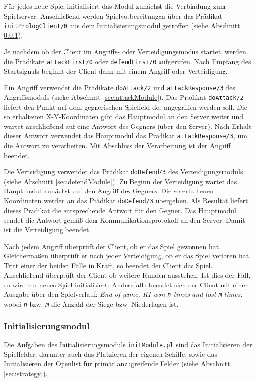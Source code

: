 	Für jedes neue Spiel initialisiert das Modul zunächst die Verbindung zum
	Spielserver. Anschließend werden Spielvorbereitungen über das Prädikat \texttt{initPrologClient/0} aus dem 
	Initialisierungsmodul getroffen (siehe Abschnitt \ref{sec:initModule}).
	
	Je nachdem ob der Client im Angriffs- oder Verteidigungsmodus startet, werden die Prädikate \texttt{attackFirst/0} oder
	\texttt{defendFirst/0} aufgerufen. Nach Empfang des Startsignals beginnt der Client dann mit einem Angriff oder Verteidigung.
	
	Ein Angriff verwendet die Prädikate \texttt{doAttack/2} und \texttt{attackResponse/3} des Angriffsmoduls (siehe Abschnitt
	\ref{sec:attackModule}).
	Das Prädikat \texttt{doAttack/2} liefert den Punkt auf dem gegnerischen Spielfeld der angegriffen werden soll.
	Die so erhaltenen X-Y-Koordinaten gibt das Hauptmodul an den Server weiter und wartet anschließend auf eine Antwort des 
	Gegners (über den Server). 
	Nach Erhalt dieser Antwort verwendet das Hauptmodul das Prädikat \texttt{attackResponse/3}, um die Antwort zu verarbeiten.
	Mit Abschluss der Verarbeitung ist der Angriff beendet.
	
	Die Verteidigung verwendet das Prädikat \texttt{doDefend/3} des Verteidigungsmoduls (siehe Abschnitt \ref{sec:defendModule}).
	Zu Beginn der Verteidigung wartet das Hauptmodul zunächst auf den Angriff des Gegners. Die so erhaltenen Koordinaten
	werden an das Prädikat \texttt{doDefend/3} übergeben. Als Resultat liefert dieses Prädikat die entsprechende Antwort für den
	Gegner. Das Hauptmodul sendet die Antwort gemäß dem Kommunikationsprotokoll an den Server. Damit ist die Verteidigung 
	beendet.
	
	Nach jedem Angriff überprüft der Client, ob er das Spiel gewonnen hat. Gleichermaßen überprüft er nach jeder Verteidigung, 
	ob er das Spiel verloren hat. Tritt einer der beiden Fälle in Kraft, so beendet der Client das Spiel. 
	Anschließend überprüft der Client ob weitere Runden ausstehen. Ist dies der Fall, so wird ein neues Spiel initialisiert.
	Andernfalls beendet sich der Client mit einer Ausgabe über den Spielverlauf:
	\textit{End of game. KI won \texttt{n} times and lost \texttt{m} times.} wobei \textit{\texttt{n}} bzw. \textit{\texttt{m}}
	die Anzahl der Siege bzw. Niederlagen ist.

\subsubsection{Initialisierungsmodul} \label{sec:initModule}
	Die Aufgaben des Initialisierungsmoduls \texttt{initModule.pl} sind das Initialisieren der Spielfelder, darunter auch
	das Platzieren der eigenen Schiffe, sowie das Initialisieren der Openlist für primär anzugreifende Felder (siehe Abschnitt \ref{sec:strategy}).
	
